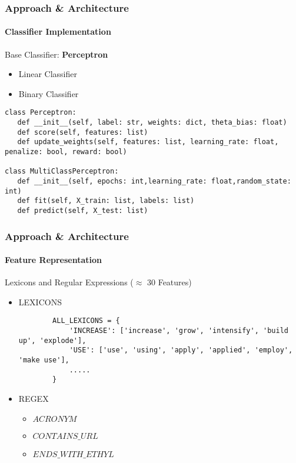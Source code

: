 \documentclass[
  xcolor={svgnames},
  hyperref={colorlinks,citecolor=DeepPink4,linkcolor=DarkRed,urlcolor=DarkBlue}
  ]{beamer}
\begin{document}
\begin{frame}[fragile]
\frametitle{Approach \& Architecture}
\framesubtitle{Classifier Implementation}

Base Classifier: {\bf {\color{red} Perceptron}}
\begin{itemize}
	\item Linear Classifier
	\item Binary Classifier
\end{itemize}
\bigskip

\begin{verbatim}
class Perceptron:
   def __init__(self, label: str, weights: dict, theta_bias: float)
   def score(self, features: list)
   def update_weights(self, features: list, learning_rate: float, penalize: bool, reward: bool)

class MultiClassPerceptron:
   def __init__(self, epochs: int,learning_rate: float,random_state: int)
   def fit(self, X_train: list, labels: list)
   def predict(self, X_test: list)

\end{verbatim}

\end{frame}



\begin{frame}[fragile]
\frametitle{Approach \& Architecture}
\framesubtitle{Feature Representation}

Lexicons and Regular Expressions ($\approx$ 30 Features)
\bigskip

\begin{itemize}
	\item LEXICONS
		\begin{verbatim}
		ALL_LEXICONS = {
		    'INCREASE': ['increase', 'grow', 'intensify', 'build up', 'explode'],
		    'USE': ['use', 'using', 'apply', 'applied', 'employ', 'make use'],
		    .....
		}
		\end{verbatim}
	\item REGEX
		\begin{itemize}
		    \item $ACRONYM$
		    \item $CONTAINS\_URL$
		    \item $ENDS\_WITH\_ETHYL$
		\end{itemize}
\end{itemize}

\end{frame}
\end{document}
